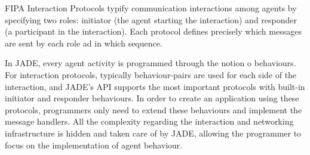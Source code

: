 FIPA Interaction Protocols typify communication interactions among agents by specifying two roles: initiator (the agent starting the interaction) and responder (a participant in the interaction). Each protocol defines precisely which messages are sent by each role ad in which sequence.

In JADE, every agent activity is programmed through the notion o behaviours. For interaction protocols, typically behaviour-pairs are used for each side of the interaction, and JADE's API supports the most important protocols with built-in initiator and responder behaviours.
In order to create an application using these protocols, programmers only need to extend these behaviours and implement the message handlers.
All the complexity regarding the interaction and networking infrastructure is hidden and taken care of by JADE, allowing the programmer to focus on the implementation of agent behaviour.